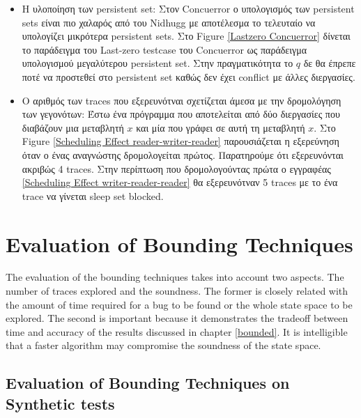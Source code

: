 \begin{itemize}
  \item Η υλοποίηση των persistent set: Στον Concuerror ο υπολογισμός των persistent sets είναι πιο χαλαρός από του
  Nidhugg με αποτέλεσμα το τελευταίο να υπολογίζει μικρότερα persistent sets. Στο Figure \ref{Lastzero Concuerror} 
  δίνεται το παράδειγμα του Last-zero testcase του Concuerror ως παράδειγμα υπολογισμού μεγαλύτερου persistent set. Στην πραγματικότητα
  το $q$ δε θα έπρεπε ποτέ να προστεθεί στο persistent set καθώς δεν έχει conflict με άλλες διεργασίες.

  \item Ο αριθμός των traces που εξερευνότναι σχετίζεται άμεσα με την δρομολόγηση των γεγονότων: Έστω ένα πρόγραμμα που αποτελείται από
      δύο διεργασίες που διαβάζουν μια μεταβλητή $x$ και μία που γράφει σε αυτή τη μεταβλητή $x$. Στο Figure \ref{Scheduling Effect
  reader-writer-reader} παρουσιάζεται η εξερεύνηση όταν ο ένας αναγνώστης δρομολογείται πρώτος. Παρατηρούμε ότι εξερευνόνται ακριβώς
  4 traces. Στην περίπτωση που δρομολογούντας πρώτα ο εγγραφέας \ref{Scheduling Effect
  writer-reader-reader} θα εξερευνότναν 5 traces με το ένα trace να γίνεται sleep set blocked.

\end{itemize}




\section{Evaluation of Bounding Techniques}
The evaluation of the bounding techniques takes into account two aspects. The number of traces explored and the
soundness. The former is closely related with the amount of time required for a bug to be found or the whole state space
to be explored. The second is important because it demonstrates the tradeoff between time and accuracy of the results
discussed in chapter \ref{bounded}. It is intelligible that a faster algorithm may compromise the soundness of the state
space.

\subsection{Evaluation of Bounding Techniques on Synthetic tests}

